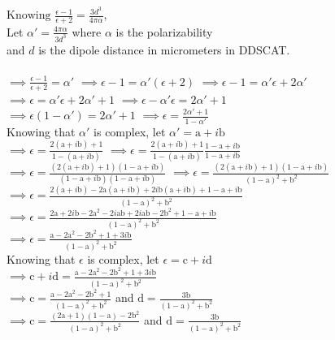 \noindent $\textrm{Knowing } \frac{\epsilon-1}{\epsilon+2}=\frac{3d^3}{4\pi\alpha}$, \\

\noindent Let $\alpha'=\frac{4\pi\alpha}{3d^3}$ where $\alpha$ is the polarizability \\ and $d$ is the dipole distance in micrometers in DDSCAT.\\\\
\noindent$\implies\frac{\epsilon-1}{\epsilon+2}=\alpha'$
$\implies\epsilon-1=\alpha'(\epsilon+2)$
$\implies\epsilon-1=\alpha'\epsilon+2\alpha'$\\
\noindent$\implies\epsilon=\alpha'\epsilon+2\alpha'+1$
$\implies\epsilon-\alpha'\epsilon=2\alpha'+1$\\
\noindent$\implies\epsilon(1-\alpha')=2\alpha'+1$
$\implies\epsilon=\frac{2\alpha'+1}{1-\alpha'}$\\

\noindent Knowing that $\alpha'$ is complex, let $\alpha'=\textrm{a}+i\textrm{b}$\\
\noindent$\implies\epsilon=\frac{2(\textrm{a}+i\textrm{b})+1}{1-(\textrm{a}+i\textrm{b})}$
$\implies\epsilon=\frac{2(\textrm{a}+i\textrm{b})+1}{1-(\textrm{a}+i\textrm{b})}\frac{1-\textrm{a}+i\textrm{b}}{1-\textrm{a}+i\textrm{b}}$\\
\noindent$\implies\epsilon=\frac{(2(\textrm{a}+i\textrm{b})+1)(1-\textrm{a}+i\textrm{b})}{(1-\textrm{a}+i\textrm{b})(1-\textrm{a}+i\textrm{b})}$
$\implies\epsilon=\frac{(2(\textrm{a}+i\textrm{b})+1)(1-\textrm{a}+i\textrm{b})}{(1-\textrm{a})^2+\textrm{b}^2}$\\
\noindent$\implies\epsilon=\frac{2(\textrm{a}+i\textrm{b})-2\textrm{a}(\textrm{a}+i\textrm{b})+2i\textrm{b}(\textrm{a}+i\textrm{b})+1-\textrm{a}+i\textrm{b}}{(1-\textrm{a})^2+\textrm{b}^2}$\\
\noindent$\implies\epsilon=\frac{2\textrm{a}+2i\textrm{b}-2\textrm{a}^2-2i\textrm{a}\textrm{b}+2i\textrm{a}\textrm{b}-2\textrm{b}^2+1-\textrm{a}+i\textrm{b}}{(1-\textrm{a})^2+\textrm{b}^2}$\\
\noindent$\implies\epsilon=\frac{\textrm{a}-2\textrm{a}^2-2\textrm{b}^2+1+3i\textrm{b}}{(1-\textrm{a})^2+\textrm{b}^2}$\\

\noindent Knowing that $\epsilon$ is complex, let $\epsilon=\textrm{c}+i\textrm{d}$\\
\noindent$\implies\textrm{c}+i\textrm{d}=\frac{\textrm{a}-2\textrm{a}^2-2\textrm{b}^2+1+3i\textrm{b}}{(1-\textrm{a})^2+\textrm{b}^2}$\\
\noindent$\implies\textrm{c}=\frac{\textrm{a}-2\textrm{a}^2-2\textrm{b}^2+1}{(1-\textrm{a})^2+\textrm{b}^2}$ and $\textrm{d}=\frac{3\textrm{b}}{(1-\textrm{a})^2+\textrm{b}^2}$\\
\noindent$\implies\textrm{c}=\frac{(2\textrm{a}+1)(1-\textrm{a})-2\textrm{b}^2}{(1-\textrm{a})^2+\textrm{b}^2}$ and $\textrm{d}=\frac{3\textrm{b}}{(1-\textrm{a})^2+\textrm{b}^2}$



